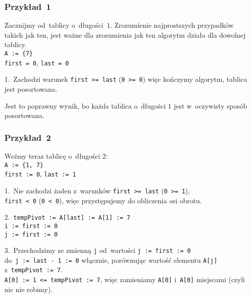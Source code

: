 \documentclass[10pt,t]{beamer}
\begin{document}
\begin{frame}
  \frametitle{Przykład~1}


  Zacznijmy od~tablicy o~długości~$1$. Zrozumienie najprostszych przypadków
  takich jak ten, jest ważne dla zrozumienia jak ten algorytm działa
  dla dowolnej tablicy. \\
  \texttt{A := \{7\} } \\
  \texttt{first = 0}, \texttt{last = 0}

  1.~Zachodzi warunek \texttt{first >= last} (\texttt{0 >= 0}) więc
  kończymy algorytm, tablica jest posortowana.

  Jest to poprawny wynik, bo każda tablica o~długości $1$ jest w~oczywisty
  sposób posortowana.

\end{frame}





\begin{frame}
  \frametitle{Przykład~2}


  Weźmy teraz tablicę o~długości $2$: \\
  \texttt{A := \{1, 7\} } \\
  \texttt{first := 0}, \texttt{last := 1}

  1.~Nie zachodzi żaden z~warunków \texttt{first >= last}
  (\texttt{0 >= 1}), \\
  \texttt{first < 0} (\texttt{0 < 0}), więc przystępujemy do obliczenia osi
  obrotu.

  2.~\texttt{tempPivot := A[last] := A[1] := 7} \\
  \texttt{i := first := 0} \\
  \texttt{j := first := 0}

  3.~Przechodzimy ze zmienną \texttt{j} od~wartości
  \texttt{j := first := 0} \\
  do~\texttt{j := last - 1 := 0} włącznie, porównując wartość elementu
  \texttt{A[j]} z~\texttt{tempPivot := 7}. \\
  \texttt{A[0] := 1 <= tempPivot := 7}, więc zamieniamy \texttt{A[0]}
  i~\texttt{A[0]} miejscami (czyli nic nie robimy).

\end{frame}
\end{document}
